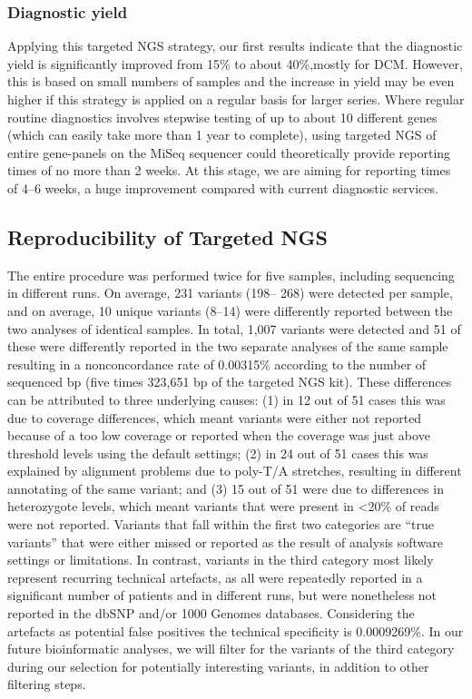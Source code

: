 \subsubsection{Diagnostic yield}
Applying this targeted NGS strategy, our first results indicate that the diagnostic yield is significantly improved from 15\% to about 40\%,mostly for DCM. 
However, this is based on small numbers of samples and the increase in yield may be even higher if this strategy is applied on a regular basis for larger series. 
Where regular routine diagnostics involves stepwise testing of up to about 10 different genes (which can easily take more than 1 year to complete), using targeted NGS of entire gene-panels on the MiSeq sequencer could theoretically provide reporting times of no more than 2 weeks. 
At this stage, we are aiming for reporting times of 4–6 weeks, a huge improvement compared with current diagnostic services.

\subsection{Reproducibility of Targeted NGS}
The entire procedure was performed twice for five samples, including sequencing in different runs. 
On average, 231 variants (198– 268) were detected per sample, and on average, 10 unique variants (8–14) were differently reported between the two analyses of identical samples. 
In total, 1,007 variants were detected and 51 of these were differently reported in the two separate analyses of the same sample resulting in a nonconcordance rate of 0.00315\% according to the number of sequenced bp (five times 323,651 bp of the targeted NGS kit). 
These differences can be attributed to three underlying causes: (1) in 12 out of 51 cases this was due to coverage differences, which meant variants were either not reported because of a too low coverage or reported when the coverage was just above threshold levels using the default settings; (2) in 24 out of 51 cases this was explained by alignment problems due to poly-T/A stretches, resulting in different annotating of the same variant; and (3) 15 out of 51 were due to differences in heterozygote levels, which meant variants that were present in {\textless}20\% of reads were not reported. 
Variants that fall within the first two categories are “true variants” that were either missed or reported as the result of analysis software settings or limitations. 
In contrast, variants in the third category most likely represent recurring technical artefacts, as all were repeatedly reported in a significant number of patients and in different runs, but were nonetheless not reported in the dbSNP and/or 1000 Genomes databases. 
Considering the artefacts as potential false positives the technical specificity is 0.0009269\%. 
In our future bioinformatic analyses, we will filter for the variants of the third category during our selection for potentially interesting variants, in addition to other filtering steps.


